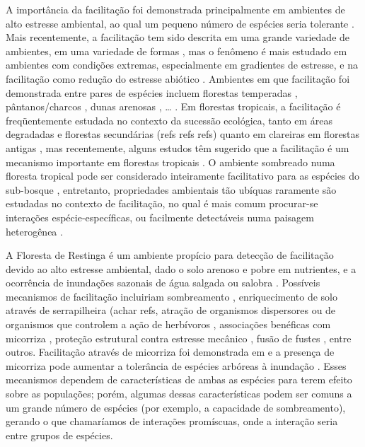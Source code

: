 \documentclass[twoside,12pt,a4paper]{report}
\begin{document}
A importância da facilitação foi demonstrada principalmente em ambientes de alto estresse ambiental,
ao qual um pequeno número de espécies seria tolerante \citep{BertnessHacker1994, Brooker2008}. 
Mais recentemente, a facilitação tem sido descrita em uma grande variedade de ambientes, em
uma variedade de formas \citep{McIntire2014}, mas o fenômeno é mais estudado em ambientes com
condições extremas, especialmente em gradientes de estresse, e na facilitação como redução do
estresse abiótico \citep{Brooker2008}. Ambientes em que facilitação foi demonstrada entre pares de
espécies incluem florestas temperadas \citep{refs}, pântanos/charcos \citep{BertnessHacker1994, etc},
dunas arenosas \citep{Castanho2014, etc}, … . Em florestas tropicais, a facilitação é freqüentemente
estudada no contexto da sucessão ecológica, tanto em áreas degradadas e florestas secundárias (refs
refs refs) quanto em clareiras em florestas antigas \citep{refs refs refs}, mas recentemente, alguns
estudos têm sugerido que a facilitação é um mecanismo importante em florestas tropicais
\citep{Ledo2015,refs}. O ambiente sombreado numa
floresta tropical pode ser considerado inteiramente facilitativo para as espécies do sub-bosque
\citep{McIntire2014}, entretanto, propriedades ambientais tão ubíquas raramente são estudadas
no contexto de facilitação, no qual é mais comum procurar-se interações espécie-específicas, ou
facilmente detectáveis numa paisagem heterogênea \citep{TODO procurar refs}.

A Floresta de Restinga é um ambiente propício para detecção de facilitação devido ao alto estresse
ambiental, dado o solo arenoso e pobre em nutrientes, e a ocorrência de inundações sazonais de água
salgada ou salobra \citep{TODO refs}. Possíveis mecanismos de facilitação incluiriam sombreamento
\citep{Castanho2014, etc}, enriquecimento de solo através de serrapilheira (achar refs, atração de
organismos dispersores \citep{achar refs CallawayBook} ou de organismos que controlem a ação de
herbívoros \citep{refs}, associações benéficas com micorriza \citep{Simard1997}, proteção
estrutural contra estresse mecânico \citep{refs}, fusão de fustes \citep{McIntire2011}, entre
outros. Facilitação através de micorriza foi demonstrada em \citep{Simard1997} e a presença de
micorriza pode aumentar a tolerância de espécies arbóreas à inundação \citep{Fougnies2007}. Esses
mecanismos dependem de características de ambas as espécies para terem efeito sobre as populações;
porém, algumas dessas características podem ser comuns a um grande número de espécies (por exemplo,
a capacidade de sombreamento), gerando o que chamaríamos de interações promíscuas, onde a interação
seria entre grupos de espécies.
\end{document}
